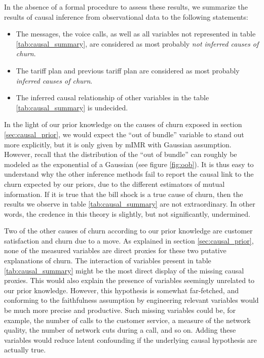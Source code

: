 In the absence of a formal procedure to assess these results, we summarize the
results of causal inference from observational data to the following statements:

\begin{itemize}
    \item The  messages, the voice calls, as well as all variables not
    represented in table \ref{tab:causal_summary}, are considered as most
    probably \emph{not inferred causes of churn}.
    \item The tariff plan and previous tariff plan are considered as most
    probably \emph{inferred causes of churn}.
    \item The inferred causal relationship of other variables in the table
    \ref{tab:causal_summary} is undecided.
\end{itemize}

In the light of our prior knowledge on the causes of churn exposed in section
\ref{sec:causal_prior}, we would expect the ``out of bundle'' variable to stand
out more explicitly, but it is only given by mIMR with Gaussian assumption.
However, recall that the distribution of the ``out of bundle'' can roughly be
modeled as the exponential of a Gaussian (see figure \ref{fig:oob}). It is thus
easy to understand why the other inference methods fail to report the causal
link to the churn expected by our priors, due to the different estimators of
mutual information. If it is true that the bill shock is a true cause of churn,
then the results we observe in table \ref{tab:causal_summary} are not
extraordinary. In other words, the credence in this theory is slightly, but not
significantly, undermined.

Two of the other causes of churn according to our prior knowledge are customer
satisfaction and churn due to a move. As explained in section
\ref{sec:causal_prior}, none of the measured variables are direct proxies for
these two putative explanations of churn. The interaction of variables present
in table \ref{tab:causal_summary} might be the most direct display of the
missing causal proxies. This would also explain the presence of variables
seemingly unrelated to our prior knowledge. However, this hypothesis is somewhat
far-fetched, and conforming to the faithfulness assumption by engineering
relevant variables would be much more precise and productive. Such missing
variables could be, for example, the number of calls to the customer service, a
measure of the network quality, the number of network cuts during a call, and so
on. Adding these variables would reduce latent confounding if the underlying
causal hypothesis are actually true.

